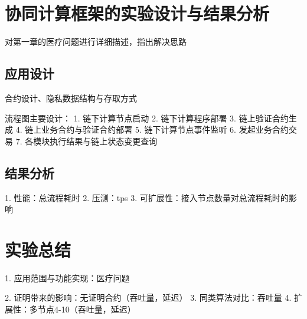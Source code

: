 \section{协同计算框架的实验设计与结果分析}
对第一章的医疗问题进行详细描述，指出解决思路

\subsection{应用设计}
合约设计、隐私数据结构与存取方式

流程图主要设计：
1. 链下计算节点启动
2. 链下计算程序部署
3. 链上验证合约生成
4. 链上业务合约与验证合约部署
5. 链下计算节点事件监听
6. 发起业务合约交易
7. 各模块执行结果与链上状态变更查询

\subsection{结果分析}
1. 性能：总流程耗时
2. 压测：tps
3. 可扩展性：接入节点数量对总流程耗时的影响

\section{实验总结}
1. 应用范围与功能实现：医疗问题

2. 证明带来的影响：无证明合约（吞吐量，延迟）
3. 同类算法对比：吞吐量
4. 扩展性：多节点4-10（吞吐量，延迟）
